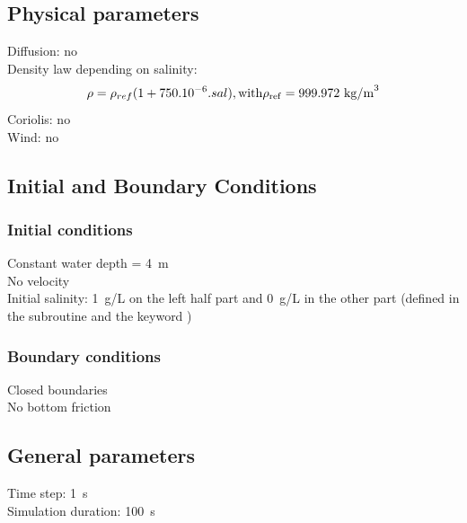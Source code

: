 \subsection{Physical parameters}
%
Diffusion: no\\
Density law depending on salinity:
\begin{equation}
\rho = \rho_{ref} (1 + 750.10^{-6} . sal ),
\rm{with } \rho_{ref} = 999.972~\rm{kg/m}^3
\end{equation}
Coriolis: no\\
Wind: no
%
%
%
%
%
%
\subsection{Initial and Boundary Conditions}
%
\subsubsection{Initial conditions}
%
Constant water depth = 4~m\\
No velocity\\
Initial salinity: 1~g/L on the left half part and 0~g/L in the other
part (defined in the subroutine  and the keyword
)
%
\subsubsection{Boundary conditions}
%
Closed boundaries\\
No bottom friction
%
\subsection{General parameters}
%
Time step: 1~s\\
Simulation duration: 100~s
%
%
%
